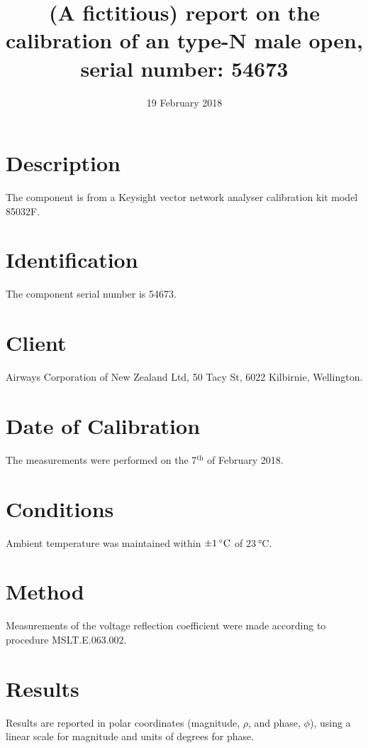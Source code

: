 \documentclass[IANZ]{MSLCalCert}
\begin{document}
 \date{19 February 2018}   %
 
 
 \title{
 	(A fictitious) report on the calibration of an type-N male open, 
 	serial number: 54673
 }
 \maketitlepage

	
%
\section{Description}
The component is from a Keysight vector network analyser calibration kit model 85032F. 


\section{Identification}
The component serial number is 54673.

\section{Client}
Airways Corporation of New Zealand Ltd, 50 Tacy St, 6022 Kilbirnie, Wellington.

\section{Date of Calibration}
The measurements were performed on the 7$^\mathrm{th}$ of February 2018.

\section{Conditions}
Ambient temperature was maintained within $\SI{\pm 1}{\celsius}$ of $\SI{23}{\celsius}$.

\section{Method}
Measurements of the voltage reflection coefficient were made according to procedure MSLT.E.063.002. 

\section{Results}
Results are reported in polar coordinates (magnitude, $\rho$, and phase, $\phi$), using a linear scale for magnitude and units of degrees for phase. 
\end{document}
